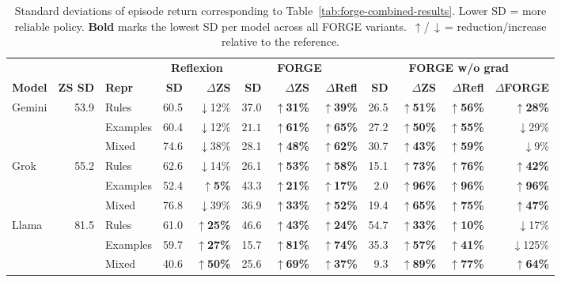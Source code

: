 \documentclass[sigconf]{acmart}
\newcommand{\up}{\ensuremath{\,{\scriptstyle\uparrow}}}
\newcommand{\dn}{\ensuremath{\,{\scriptstyle\downarrow}}}
\begin{document}
\begin{table}[htbp]
  \centering
  \scriptsize
  \caption{Standard deviations of episode return corresponding to
  Table~\ref{tab:forge-combined-results}. Lower SD = more reliable policy.
  \textbf{Bold} marks the lowest SD per model across all FORGE variants.
  \up/\dn\,= reduction/increase relative to the reference.}
  \label{tab:forge-sd-results}
  \begin{tabular}{l r l rr rrr rrrr}
  \toprule
  & & & \multicolumn{2}{c}{\textbf{Reflexion}} & \multicolumn{3}{c}{\textbf{FORGE}} & \multicolumn{4}{c}{\textbf{FORGE w/o grad}} \\
  \cmidrule(lr){4-5}\cmidrule(lr){6-8}\cmidrule(lr){9-12}
  \textbf{Model} & \textbf{ZS SD} & \textbf{Repr}
    & \textbf{SD} & $\Delta$\textbf{ZS}
    & \textbf{SD} & $\Delta$\textbf{ZS} & $\Delta$\textbf{Refl}
    & \textbf{SD} & $\Delta$\textbf{ZS} & $\Delta$\textbf{Refl} & $\Delta$\textbf{FORGE} \\
  \midrule
  Gemini & \multirow{3}{*}{53.9} & Rules & 60.5 & \dn12\% & 37.0 & \textbf{\up31\%} & \textbf{\up39\%} & 26.5 & \textbf{\up51\%} & \textbf{\up56\%} & \textbf{\up28\%} \\
   &  & Examples & 60.4 & \dn12\% & $\mathbf{21.1}$ & \textbf{\up61\%} & \textbf{\up65\%} & 27.2 & \textbf{\up50\%} & \textbf{\up55\%} & \dn29\% \\
   &  & Mixed & 74.6 & \dn38\% & 28.1 & \textbf{\up48\%} & \textbf{\up62\%} & 30.7 & \textbf{\up43\%} & \textbf{\up59\%} & \dn9\% \\
  \midrule
  Grok & \multirow{3}{*}{55.2} & Rules & 62.6 & \dn14\% & 26.1 & \textbf{\up53\%} & \textbf{\up58\%} & 15.1 & \textbf{\up73\%} & \textbf{\up76\%} & \textbf{\up42\%} \\
   &  & Examples & 52.4 & \textbf{\up5\%} & 43.3 & \textbf{\up21\%} & \textbf{\up17\%} & $\mathbf{2.0}$ & \textbf{\up96\%} & \textbf{\up96\%} & \textbf{\up96\%} \\
   &  & Mixed & 76.8 & \dn39\% & 36.9 & \textbf{\up33\%} & \textbf{\up52\%} & 19.4 & \textbf{\up65\%} & \textbf{\up75\%} & \textbf{\up47\%} \\
  \midrule
  Llama & \multirow{3}{*}{81.5} & Rules & 61.0 & \textbf{\up25\%} & 46.6 & \textbf{\up43\%} & \textbf{\up24\%} & 54.7 & \textbf{\up33\%} & \textbf{\up10\%} & \dn17\% \\
   &  & Examples & 59.7 & \textbf{\up27\%} & 15.7 & \textbf{\up81\%} & \textbf{\up74\%} & 35.3 & \textbf{\up57\%} & \textbf{\up41\%} & \dn125\% \\
   &  & Mixed & 40.6 & \textbf{\up50\%} & 25.6 & \textbf{\up69\%} & \textbf{\up37\%} & $\mathbf{9.3}$ & \textbf{\up89\%} & \textbf{\up77\%} & \textbf{\up64\%} \\

\end{tabular}
\end{table}
\end{document}
